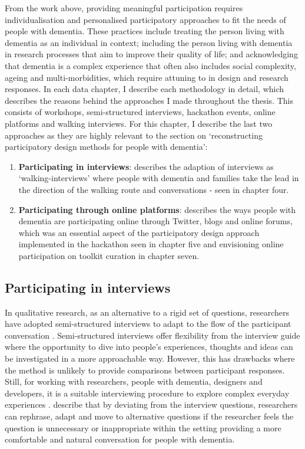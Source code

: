 From the work above, providing meaningful participation requires individualisation and personalised participatory approaches to fit the needs of people with dementia.  These practices include treating the person living with dementia as an individual in context; including the person living with dementia in research processes that aim to improve their quality of life; and acknowledging that dementia is a complex experience that often also includes social complexity, ageing and multi-morbidities, which require attuning to in design and research responses. In each data chapter, I describe each methodology in detail, which describes the reasons behind the approaches I made throughout the thesis. This consists of workshops, semi-structured interviews, hackathon events, online platforms and walking interviews. For this chapter, I describe the last two approaches as they are highly relevant to the section on `reconstructing participatory design methods for people with dementia':
\begin{enumerate}

\item \textbf{Participating in interviews}: describes the adaption of interviews as `walking-interviews' where people with dementia and families take the lead in the direction of the walking route and conversations
- seen in chapter four.

\item \textbf{Participating through online platforms}: describes the ways people with dementia are participating online through Twitter, blogs and online forums, which was an essential aspect of the participatory design approach implemented in the hackathon seen in chapter five and envisioning online participation on toolkit curation in chapter seven.
\end{enumerate}

\subsection{Participating in interviews}
\label{PD:Interviews}
In qualitative research, as an alternative to a rigid set of questions, researchers have adopted semi-structured interviews to adapt to the flow of the participant conversation \citep{cheston2000involving}. Semi-structured interviews offer flexibility from the interview guide where the opportunity to dive into people’s experiences, thoughts and ideas can be investigated in a more approachable way. However, this has drawbacks where the method is unlikely to provide comparisons between participant responses. Still, for working with researchers, people with dementia, designers and developers, it is a suitable interviewing procedure to explore complex everyday experiences  \citep{horton2004qualitative}. \cite{samsi2020interviewing} describe that by deviating from the interview questions, researchers can rephrase, adapt and move to alternative questions if the researcher feels the question is unnecessary or inappropriate within the setting providing a more comfortable and natural conversation for people with dementia.

